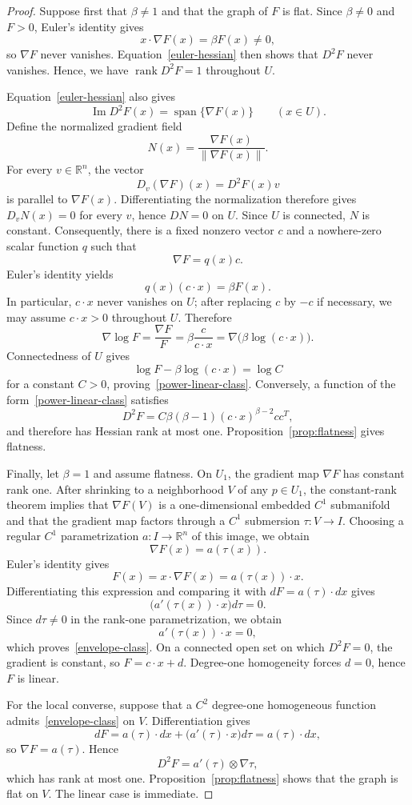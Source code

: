 \documentclass[12pt]{amsart}
\begin{document}
\begin{proof}
Suppose first that $\beta\ne1$ and that the graph of $F$ is flat. Since $\beta\ne0$ and $F>0$, Euler's identity gives
\[
 x\cdot\nabla F(x)=\beta F(x)\ne0,
\]
so $\nabla F$ never vanishes. Equation~\eqref{euler-hessian} then shows that $D^2F$ never vanishes. Hence, we have
\(
 \operatorname{rank}D^2F=1
\)
throughout $U$.

Equation~\eqref{euler-hessian} also gives
\[
 \operatorname{Im}D^2F(x)=\operatorname{span}\{\nabla F(x)\}
 \qquad (x\in U).
\]
Define the normalized gradient field
\[
 N(x)=\frac{\nabla F(x)}{\|\nabla F(x)\|}.
\]
For every $v\in\mathbb R^n$, the vector
\[
 D_v(\nabla F)(x)=D^2F(x)v
\]
is parallel to $\nabla F(x)$. Differentiating the normalization therefore gives $D_vN(x)=0$ for every $v$, hence $DN=0$ on $U$. Since $U$ is connected, $N$ is constant. Consequently, there is a fixed nonzero vector $c$ and a nowhere-zero scalar function $q$ such that
\[
 \nabla F=q(x)c.
\]
Euler's identity yields
\[
 q(x)(c\cdot x)=\beta F(x).
\]
In particular, $c\cdot x$ never vanishes on $U$; after replacing $c$ by $-c$ if necessary, we may assume $c\cdot x>0$ throughout $U$. Therefore
\[
 \nabla\log F
 =\frac{\nabla F}{F}
 =\beta\frac{c}{c\cdot x}
 =\nabla\bigl(\beta\log(c\cdot x)\bigr).
\]
Connectedness of $U$ gives
\[
 \log F-\beta\log(c\cdot x)=\log C
\]
for a constant $C>0$, proving~\eqref{power-linear-class}. Conversely, a function of the form~\eqref{power-linear-class} satisfies
\[
 D^2F=C\beta(\beta-1)(c\cdot x)^{\beta-2}cc^T,
\]
and therefore has Hessian rank at most one. Proposition~\ref{prop:flatness} gives flatness.

Finally, let $\beta=1$ and assume flatness. On $U_1$, the
gradient map \(\nabla F\) has constant rank one. After shrinking to a
neighborhood \(V\) of any \(p\in U_1\), the constant-rank theorem implies
that \(\nabla F(V)\) is a one-dimensional embedded \(C^1\) submanifold and
that the gradient map factors through a \(C^1\) submersion
\(\tau:V\to I\). Choosing a regular \(C^1\) parametrization
\(a:I\to\mathbb R^n\) of this image, we obtain
\[
 \nabla F(x)=a(\tau(x)).
\] Euler's identity gives
\[
 F(x)=x\cdot\nabla F(x)=a(\tau(x))\cdot x.
\]
Differentiating this expression and comparing it with $dF=a(\tau)\cdot dx$ gives
\[
 \bigl(a'(\tau(x))\cdot x\bigr)d\tau=0.
\]
Since $d\tau\ne0$ in the rank-one parametrization, we obtain
\[
 a'(\tau(x))\cdot x=0,
\]
which proves~\eqref{envelope-class}. On a connected open set on which $D^2F=0$, the gradient is constant, so $F=c\cdot x+d$. Degree-one homogeneity forces $d=0$, hence $F$ is linear.

For the local converse, suppose that a $C^2$ degree-one homogeneous function admits~\eqref{envelope-class} on $V$. Differentiation gives
\[
 dF=a(\tau)\cdot dx+\bigl(a'(\tau)\cdot x\bigr)d\tau=a(\tau)\cdot dx,
\]
so $\nabla F=a(\tau)$. Hence
\[
 D^2F=a'(\tau)\otimes\nabla\tau,
\]
which has rank at most one. Proposition~\ref{prop:flatness} shows that the graph is flat on $V$. The linear case is immediate.
\end{proof}
\end{document}
